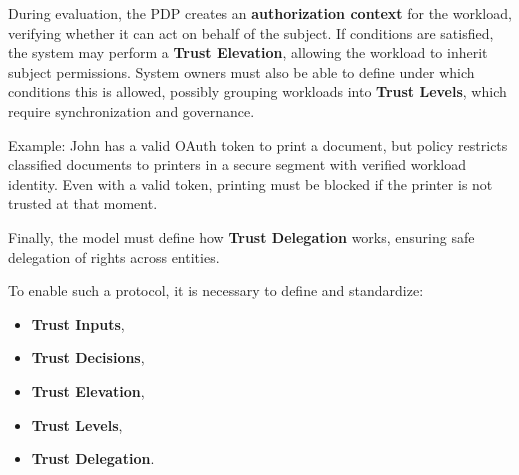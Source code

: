 \vspace{0.5em}  
During evaluation, the PDP creates an \textbf{authorization context} for the workload, 
verifying whether it can act on behalf of the subject.  
If conditions are satisfied, the system may perform a \textbf{Trust Elevation}, 
allowing the workload to inherit subject permissions.  
System owners must also be able to define under which conditions this is allowed, 
possibly grouping workloads into \textbf{Trust Levels}, which require synchronization and governance.  

\begin{boxF}
Example: John has a valid OAuth token to print a document, 
but policy restricts classified documents to printers in a secure segment with verified workload identity.  
Even with a valid token, printing must be blocked if the printer is not trusted at that moment.
\end{boxF}

Finally, the model must define how \textbf{Trust Delegation} works, 
ensuring safe delegation of rights across entities.  

\vspace{0.5em}  
To enable such a protocol, it is necessary to define and standardize:
\begin{itemize}
    \item \textbf{Trust Inputs},
    \item \textbf{Trust Decisions},
    \item \textbf{Trust Elevation},
    \item \textbf{Trust Levels},
    \item \textbf{Trust Delegation}.
\end{itemize}
